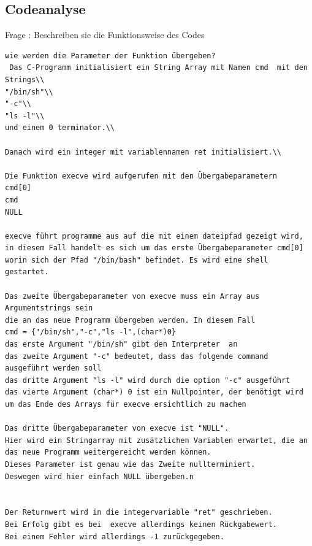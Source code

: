 \documentclass[12pt]{article}
\begin{document}
\subsection{Codeanalyse}
Frage : Beschreiben sie die Funktionsweise des Codes
\begin{lstlisting}
wie werden die Parameter der Funktion übergeben?
 Das C-Programm initialisiert ein String Array mit Namen cmd  mit den Strings\\
"/bin/sh"\\
"-c"\\
"ls -l"\\
und einem 0 terminator.\\

Danach wird ein integer mit variablennamen ret initialisiert.\\

Die Funktion execve wird aufgerufen mit den Übergabeparametern
cmd[0]
cmd
NULL

execve führt programme aus auf die mit einem dateipfad gezeigt wird,
in diesem Fall handelt es sich um das erste Übergabeparameter cmd[0]
worin sich der Pfad "/bin/bash" befindet. Es wird eine shell gestartet.

Das zweite Übergabeparameter von execve muss ein Array aus Argumentstrings sein
die an das neue Programm übergeben werden. In diesem Fall
cmd = {"/bin/sh","-c","ls -l",(char*)0}
das erste Argument "/bin/sh" gibt den Interpreter  an
das zweite Argument "-c" bedeutet, dass das folgende command ausgeführt werden soll
das dritte Argument "ls -l" wird durch die option "-c" ausgeführt
das vierte Argument (char*) 0 ist ein Nullpointer, der benötigt wird
um das Ende des Arrays für execve ersichtlich zu machen

Das dritte Übergabeparameter von execve ist "NULL".
Hier wird ein Stringarray mit zusätzlichen Variablen erwartet, die an
das neue Programm weitergereicht werden können.
Dieses Parameter ist genau wie das Zweite nullterminiert.
Deswegen wird hier einfach NULL übergeben.n


Der Returnwert wird in die integervariable "ret" geschrieben.
Bei Erfolg gibt es bei  execve allerdings keinen Rückgabewert.
Bei einem Fehler wird allerdings -1 zurückgegeben.
\end{lstlisting}
\end{document}
